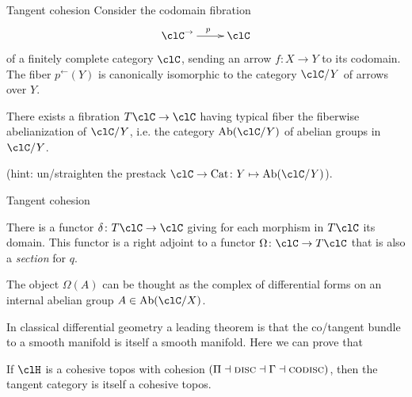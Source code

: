 \documentclass[presentation]{beamer}
\begin{document}
%
%
%
%
%
%
%
\begin{frame}{Tangent cohesion}
  Consider the \alert{codomain fibration}
  \[
  \xymatrix{
  \clC^\to \ar[r]^p & \clC
  }
  \]
  of a finitely complete category $\clC$, sending an arrow $f\colon X\to Y$ to its codomain. The fiber $p^\leftarrow(Y)$ is canonically isomorphic to the category $\clC/Y$ of arrows over $Y$.
  \onslide<+->
  \begin{block}{}
    There exists a fibration $T\clC\to \clC$ having typical fiber the fiberwise abelianization of $\clC/Y$, i.e. the category $\text{Ab}(\clC/Y)$ of abelian groups in $\clC/Y$.
  \end{block}
  \onslide<+->
  (hint: un/straighten the prestack $\clC\to\text{Cat}\colon Y\mapsto \text{Ab}(\clC/Y)$).
  \onslide<+->
\end{frame}
%
%
%
%
%
%
%
%
%
%
%
%
%
%
\begin{frame}{Tangent cohesion}
  \begin{prop}
    There is a functor $\delta\colon T\clC\to \clC$ giving for each morphism in $T\clC$ its domain. This functor is a right adjoint to a functor $\Omega\colon \clC\to T\clC$ that is also a \emph{section} for $q$.
    
    \onslide<+->
    The object $\Omega(A)$ can be thought as the complex of \alert{differential forms} on an internal abelian group $A\in \text{Ab}(\clC/X)$.
  \end{prop}
  
  \onslide<+->
  \vspace*{\fill}
  In classical differential geometry a leading theorem is that the co/tangent bundle to a smooth manifold is  itself a smooth manifold. Here we can prove that
  
  \onslide<+->
  \vspace*{\fill}
  \begin{prop}
    If $\clH$ is a cohesive topos with cohesion $(\Pi\dashv\textsc{disc}\dashv\Gamma\dashv\textsc{codisc})$, then the tangent category is itself a cohesive topos.
  \end{prop}
\end{frame}
\end{document}
